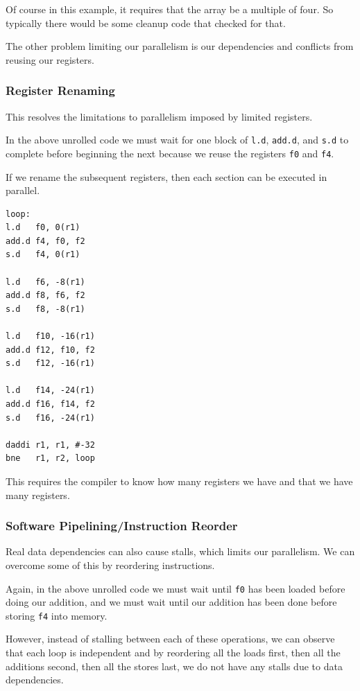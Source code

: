 \documentclass{article}
\begin{document}
\normalsize
Of course in this example, it requires that the array be a multiple of four. So typically there would be some cleanup code that checked for that. 

The other problem limiting our parallelism is our dependencies and conflicts from reusing our registers. 


\subsubsection{Register Renaming}

This resolves the limitations to parallelism imposed by limited registers. 

In the above unrolled code we must wait for one block of \texttt{l.d}, \texttt{add.d}, and \texttt{s.d} to complete before beginning the next because we reuse the registers \texttt{f0} and \texttt{f4}. 

If we rename the subsequent registers, then each section can be executed in parallel. 

\scriptsize
\begin{verbatim}
loop:
l.d   f0, 0(r1)
add.d f4, f0, f2
s.d   f4, 0(r1)

l.d   f6, -8(r1)
add.d f8, f6, f2
s.d   f8, -8(r1)

l.d   f10, -16(r1)
add.d f12, f10, f2
s.d   f12, -16(r1)

l.d   f14, -24(r1)
add.d f16, f14, f2
s.d   f16, -24(r1)

daddi r1, r1, #-32
bne   r1, r2, loop
\end{verbatim}
\normalsize

This requires the compiler to know how many registers we have and that we have many registers. 

\subsubsection{Software Pipelining/Instruction Reorder}

Real data dependencies can also cause stalls, which limits our parallelism. We can overcome some of this by reordering instructions. 

Again, in the above unrolled code we must wait until \texttt{f0} has been loaded before doing our addition, and we must wait until our addition has been done before storing \texttt{f4} into memory. 

However, instead of stalling between each of these operations, we can observe that each loop is independent and by reordering all the loads first, then all the additions second, then all the stores last, we do not have any stalls due to data dependencies. 
\end{document}
